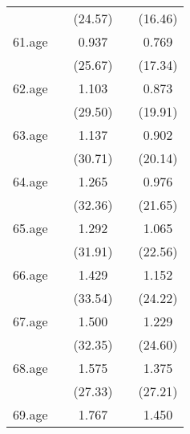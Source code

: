 {\begin{tabular}{l*{4}{c}}
            &                     &     (24.57)         &                     &     (16.46)         \\
[1em]
61.age      &                     &       0.937\sym{***}&                     &       0.769\sym{***}\\
            &                     &     (25.67)         &                     &     (17.34)         \\
[1em]
62.age      &                     &       1.103\sym{***}&                     &       0.873\sym{***}\\
            &                     &     (29.50)         &                     &     (19.91)         \\
[1em]
63.age      &                     &       1.137\sym{***}&                     &       0.902\sym{***}\\
            &                     &     (30.71)         &                     &     (20.14)         \\
[1em]
64.age      &                     &       1.265\sym{***}&                     &       0.976\sym{***}\\
            &                     &     (32.36)         &                     &     (21.65)         \\
[1em]
65.age      &                     &       1.292\sym{***}&                     &       1.065\sym{***}\\
            &                     &     (31.91)         &                     &     (22.56)         \\
[1em]
66.age      &                     &       1.429\sym{***}&                     &       1.152\sym{***}\\
            &                     &     (33.54)         &                     &     (24.22)         \\
[1em]
67.age      &                     &       1.500\sym{***}&                     &       1.229\sym{***}\\
            &                     &     (32.35)         &                     &     (24.60)         \\
[1em]
68.age      &                     &       1.575\sym{***}&                     &       1.375\sym{***}\\
            &                     &     (27.33)         &                     &     (27.21)         \\
[1em]
69.age      &                     &       1.767\sym{***}&                     &       1.450\sym{***}\\

\end{tabular}}
